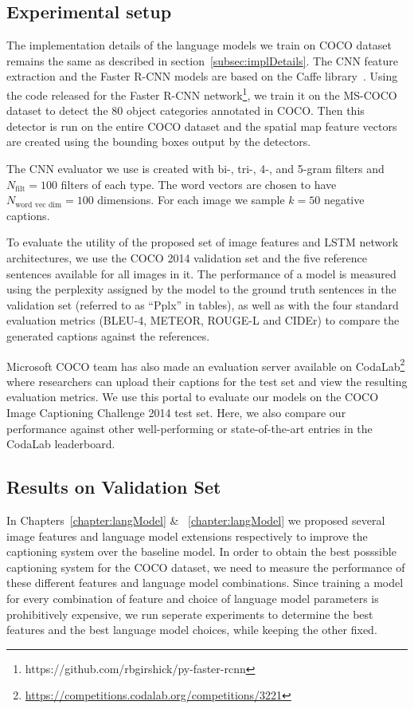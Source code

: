 \subsection{Experimental setup}
The implementation details of the language models we train on COCO dataset
remains the same as described in section~\ref{subsec:implDetails}.
The CNN feature extraction and the Faster R-CNN models are based on the Caffe
library~\cite{jia2014caffe}.
Using the code released for the Faster R-CNN
network\footnote{https://github.com/rbgirshick/py-faster-rcnn}, we train it on
the MS-COCO dataset to detect the 80 object categories annotated in COCO.
Then this detector is run on the entire COCO dataset and the spatial map feature
vectors are created using the bounding boxes output by the detectors.

The CNN evaluator we use is created with bi-, tri-, 4-, and 5-gram filters and
$N_{\text{filt}}=100$ filters of each type.
The word vectors are chosen to have $N_{\text{word vec dim}}=100$ dimensions.
For each image we sample $k=50$ negative captions.

To evaluate the utility of the proposed set of image features and LSTM network
architectures, we use the COCO 2014 validation set and the five reference
sentences available for all images in it.
The performance of a model is measured using the perplexity assigned by the
model to the ground truth sentences in the validation set (referred to as
``Pplx'' in tables), as well as with the four standard evaluation metrics
(BLEU-4, METEOR, ROUGE-L and CIDEr) to compare the generated captions against
the references.

Microsoft COCO team has also made an evaluation server available on
CodaLab\footnote{\url{https://competitions.codalab.org/competitions/3221}} where
researchers can upload their captions for the test set and view the resulting
evaluation metrics.
We use this portal to evaluate our models on the COCO Image Captioning Challenge
2014 test set. 
Here, we also compare our performance against other well-performing or
state-of-the-art entries in the CodaLab leaderboard.


\subsection{Results on Validation Set}
In Chapters~\ref{chapter:langModel} \& ~\ref{chapter:langModel} we proposed
several image features and language model extensions respectively to improve the
captioning system over the baseline model.
In order to obtain the best posssible captioning system for the COCO dataset, we
need to measure the performance of these different features and language model
combinations.
Since training a model for every combination of feature and choice of language
model parameters is prohibitively expensive, we run seperate experiments to
determine the best features and the best language model choices, while keeping
the other fixed.

